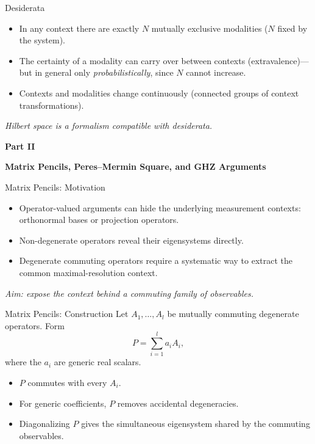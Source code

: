 \documentclass[xcolor=dvipsnames]{beamer}
\newenvironment{slideitems}{%
  \begin{itemize}\setlength{\itemsep}{0.55em}\setlength{\parskip}{0pt}%
}{\end{itemize}}
\newcommand{\partslide}[2]{%
  \begin{frame}[plain]
    \centering
    \vfill
    {\Large\bfseries #1}\par\vspace{2mm}
    {\Large\bfseries #2}
    \vfill
  \end{frame}
}
\begin{document}
\begin{frame}{Desiderata}
\begin{slideitems}
  \item In any context there are exactly $N$
        mutually exclusive modalities ($N$ fixed by the system).
  \item  The certainty of a modality can
        carry over between contexts (extravalence)---but in general
        only \emph{probabilistically}, since $N$ cannot increase.
  \item Contexts and modalities change
        continuously (connected groups of context transformations).
\end{slideitems}



\vspace{1mm}
\normalsize
\textit{Hilbert space is a formalism compatible with desiderata.}
\end{frame}

\partslide{Part II}{Matrix Pencils, Peres--Mermin Square, and GHZ Arguments}

\begin{frame}{Matrix Pencils: Motivation}
\begin{slideitems}
  \item Operator-valued arguments can hide the underlying measurement contexts:
        orthonormal bases or projection operators.
  \item Non-degenerate operators reveal their eigensystems directly.
  \item Degenerate commuting operators require a systematic way to extract the
        common maximal-resolution context.
\end{slideitems}

\vspace{4mm}
\centering
\textit{Aim: expose the context behind a commuting family of observables.}
\end{frame}

\begin{frame}{Matrix Pencils: Construction}
Let $A_1,\dots,A_l$ be mutually commuting degenerate operators.  Form
\[
  P=\sum_{i=1}^{l} a_i A_i,
\]
where the $a_i$ are generic real scalars.

\vspace{2mm}
\begin{slideitems}
  \item $P$ commutes with every $A_i$.
  \item For generic coefficients, $P$ removes accidental degeneracies.
  \item Diagonalizing $P$ gives the simultaneous eigensystem shared by the
        commuting observables.
\end{slideitems}
\end{frame}
\end{document}
